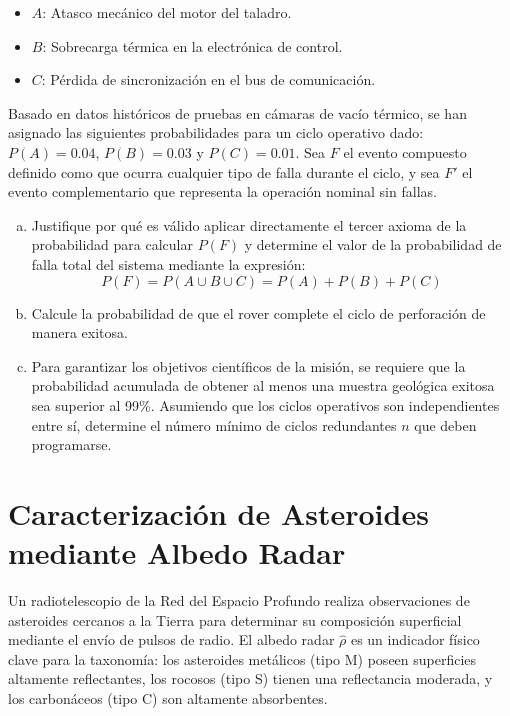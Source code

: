 \documentclass[a4paper]{article}
\begin{document}
\begin{itemize}
\item $A$: Atasco mecánico del motor del taladro.
\item $B$: Sobrecarga térmica en la electrónica de control.
\item $C$: Pérdida de sincronización en el bus de comunicación.
\end{itemize}

Basado en datos históricos de pruebas en cámaras de vacío térmico, se han asignado las siguientes probabilidades para un ciclo operativo dado: $P(A) = 0.04$, $P(B) = 0.03$ y $P(C) = 0.01$. Sea $F$ el evento compuesto definido como que ocurra cualquier tipo de falla durante el ciclo, y sea $F'$ el evento complementario que representa la operación nominal sin fallas.



\begin{enumerate}[a)]
\item Justifique por qué es válido aplicar directamente el tercer axioma de la probabilidad para calcular $P(F)$ y determine el valor de la probabilidad de falla total del sistema mediante la expresión:
$$ P(F) = P(A \cup B \cup C) = P(A) + P(B) + P(C) $$
\item Calcule la probabilidad de que el rover complete el ciclo de perforación de manera exitosa.
\item Para garantizar los objetivos científicos de la misión, se requiere que la probabilidad acumulada de obtener al menos una muestra geológica exitosa sea superior al 99\%. Asumiendo que los ciclos operativos son independientes entre sí, determine el número mínimo de ciclos redundantes $n$ que deben programarse.
\end{enumerate}

\section{Caracterización de Asteroides mediante Albedo Radar}
\label{sec:problema-13}

Un radiotelescopio de la Red del Espacio Profundo realiza observaciones de asteroides cercanos a la Tierra para determinar su composición superficial mediante el envío de pulsos de radio. El albedo radar $\hat{\rho}$ es un indicador físico clave para la taxonomía: los asteroides metálicos (tipo M) poseen superficies altamente reflectantes, los rocosos (tipo S) tienen una reflectancia moderada, y los carbonáceos (tipo C) son altamente absorbentes.
\end{document}
